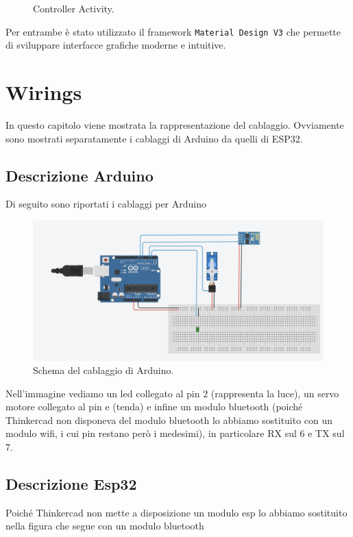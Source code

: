 \documentclass[a4paper,12pt]{report}
\begin{document}
\begin{itemize}
\begin{figure}[H]
        \caption{Controller Activity.}
        \label{fig:controller}
    \end{figure}
\end{itemize}
Per entrambe è stato utilizzato il framework \texttt{Material Design V3} che permette di sviluppare interfacce grafiche moderne e intuitive. 




\chapter{Wirings}
In questo capitolo viene mostrata la rappresentazione del cablaggio.
Ovviamente sono mostrati separatamente i cablaggi di Arduino da quelli di ESP32.
\section{Descrizione Arduino}
Di seguito sono riportati i cablaggi per Arduino

\begin{figure}[H]
\centering
\includegraphics[width=\textwidth]{img/wire-arduino.png}
\caption{Schema del cablaggio di Arduino.}
\label{fig:wiringsarduino}
\end{figure}

Nell'immagine vediamo un led collegato al pin 2 (rappresenta la luce), un servo motore collegato al pin e (tenda) e infine un modulo bluetooth (poiché Thinkercad non disponeva del modulo bluetooth lo abbiamo sostituito con un modulo wifi, i cui pin restano però i medesimi), in particolare RX sul 6 e TX sul 7.

\section{Descrizione Esp32}
Poiché Thinkercad non mette a disposizione un modulo esp lo abbiamo sostituito nella figura che segue con un modulo bluetooth 
\end{document}
